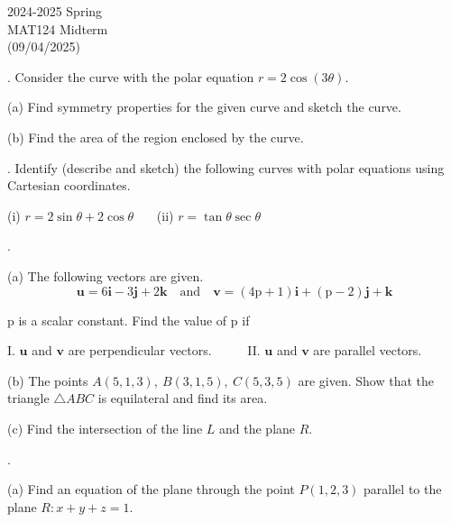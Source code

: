 \documentclass{article}
\begin{document}
\pagestyle{empty}
\large

\begin{center}
2024-2025 Spring \\MAT124 Midterm\\(09/04/2025)
\end{center}

. Consider the curve with the polar equation $r=2\cos(3\theta)$.

\hfill

\noindent (a) Find symmetry properties for the given curve and sketch the curve.

\hfill

\noindent (b) Find the area of the region enclosed by the curve.

\hfill

. Identify (describe and sketch) the following curves with polar equations using Cartesian coordinates.

\hfill

\noindent (i) $r=2\sin\theta +2\cos\theta$ \ \ \ (ii) $r=\tan\theta\sec\theta$

\hfill

.

\hfill

\noindent (a) The following vectors are given.
\[\mathbf{u}=6\mathbf{i}-3\mathbf{j}+2\mathbf{k}\quad\text{and}\quad\mathbf{v}=(4\mathrm{p}+1)\mathbf{i}+(\mathrm{p}-2)\mathbf{j}+\mathbf{k}\]

\noindent $\mathrm{p}$ is a scalar constant. Find the value of $\mathrm{p}$ if

\hfill

\noindent I. $\mathbf{u}$ and $\mathbf{v}$ are perpendicular vectors. \ \ \ \ \ II. $\mathbf{u}$ and $\mathbf{v}$ are parallel vectors.

\hfill

\noindent (b) The points $A(5,1,3),\:B(3,1,5),\:C(5,3,5)$ are given. Show that the triangle $\triangle{ABC}$ is equilateral and find its area.

\hfill

\noindent (c) Find the intersection of the line $L$ and the plane $R$.

\hfill

.

\hfill

\noindent (a) Find an equation of the plane through the point $P(1,2,3)$ parallel to the plane $R: x+y+z=1$.

\hfill
\end{document}
